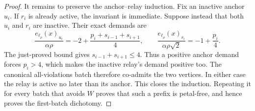 \begin{proof}
It remains to preserve the anchor--relay induction.  Fix an inactive anchor
$u_i$.  If $r_i$ is already active, the invariant is immediate.  Suppose
instead that both $u_i$ and $r_i$ are inactive.  Their exact demands are
\begin{equation}
 \frac{e_{\ell_\rho}(x)_{u_i}}{\alpha\rho}
 =-2+\frac{p_i+s_{i-1}+s_{i+1}}4,
 \qquad
 \frac{e_{\ell_\rho}(x)_{r_i}}{\alpha\rho\sqrt2}
 =-1+\frac{p_i}{4}.
 \label{eq:double-cycle-feed-inactive-demands}
\end{equation}
The just-proved bound gives $s_{i-1}+s_{i+1}\leq4$.  Thus a positive anchor
demand forces $p_i>4$, which makes the inactive relay's demand positive too.
The canonical all-violations batch therefore co-admits the two vertices.  In
either case the relay is active no later than its anchor.  This closes the
induction.  Repeating it for every batch that avoids $W$ proves that such a
prefix is petal-free, and hence proves the first-batch dichotomy.
\end{proof}
